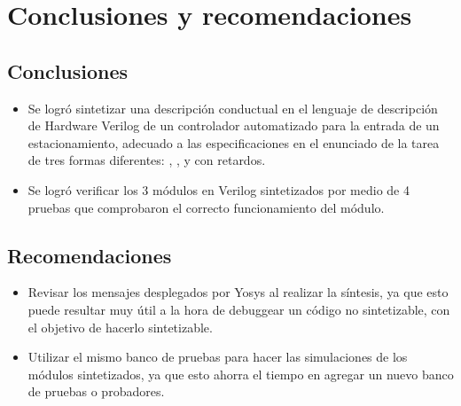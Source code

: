 \section{Conclusiones y recomendaciones}
\subsection{Conclusiones}
\begin{itemize}
    \item Se logró sintetizar una descripción conductual en el lenguaje de descripción de Hardware Verilog de un controlador automatizado para la entrada de un estacionamiento, adecuado a las especificaciones en el enunciado de la tarea de tres formas diferentes: , , y  con retardos.
    \item Se logró verificar los 3 módulos en Verilog sintetizados por medio de 4 pruebas que comprobaron el correcto funcionamiento del módulo.
\end{itemize}
\subsection{Recomendaciones}
\begin{itemize}
    \item Revisar los mensajes desplegados por Yosys al realizar la síntesis, ya que esto puede resultar muy útil a la hora de debuggear un código no sintetizable, con el objetivo de hacerlo sintetizable. 
    \item Utilizar el mismo banco de pruebas para hacer las simulaciones de los módulos sintetizados, ya que esto ahorra el tiempo en agregar un nuevo banco de pruebas o probadores.
\end{itemize}
